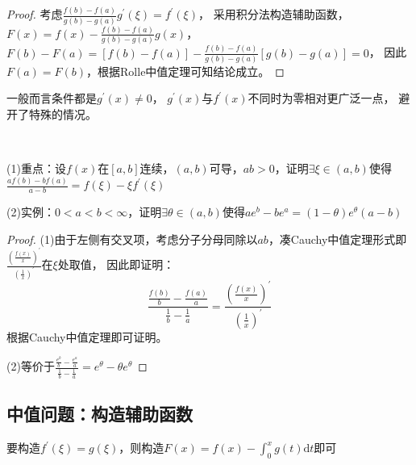 \begin{proof}
  考虑$\frac{f(b) - f(a)}{g(b) - g(a)}g^{\prime}(\xi) = f^{\prime}(\xi)$，
  采用积分法构造辅助函数，$F(x) = f(x) - \frac{f(b) - f(a)}{g(b) - g(a)}g(x)$，
  $F(b) - F(a) = [f(b) - f(a)] - \frac{f(b) - f(a)}{g(b) - g(a)}[g(b) - g(a)] = 0$，
  因此$F(a) = F(b)$，根据Rolle中值定理可知结论成立。
\end{proof}

\begin{note}
  一般而言条件都是$g^{\prime}(x) \neq 0$，
  $g^{\prime}(x)$与$f^{\prime}(x)$不同时为零相对更广泛一点，
  避开了特殊的情况。
\end{note}

~

\begin{exercise}[Cauchy中值定理基本应用]
  (1)重点：设$f(x)$在$[a,b]$连续，$(a,b)$可导，$ab > 0$，证明$\exists \xi \in (a,b)$使得
  $\frac{af(b) - bf(a)}{a - b} = f(\xi) - \xi f^{\prime}(\xi)$

  (2)实例：$0 < a < b < \infty$，证明$\exists \theta \in (a,b)$使得$ae^b - be^a = (1 - \theta) e^{\theta}(a - b)$
\end{exercise}

\begin{proof}
  (1)由于左侧有交叉项，考虑分子分母同除以$ab$，凑Cauchy中值定理形式即$\frac{(\frac{f(x)}{x})^{\prime}}{(\frac{1}{x})^{\prime}}$在$\xi$处取值，
  因此即证明：
  \begin{equation*}
    \frac{\frac{f(b)}{b} - \frac{f(a)}{a}}{\frac{1}{b} - \frac{1}{a}} = \frac{(\frac{f(x)}{x})^{\prime}}{(\frac{1}{x})^{\prime}}
  \end{equation*}
  根据Cauchy中值定理即可证明。

  (2)等价于$\frac{\frac{e^b}{b} - \frac{e^a}{a}}{\frac{1}{b} - \frac{1}{a}} = e^{\theta} - \theta e^{\theta}$
\end{proof}




\subsection{中值问题：构造辅助函数}

\begin{theorem}[直接积分法]
  要构造$f^{\prime}(\xi) = g(\xi)$，则构造$F(x) = f(x) - \int_0^x g(t)\mathrm{d} t$即可
\end{theorem}

